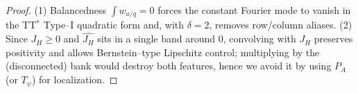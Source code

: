 \begin{proof}
(1) Balancedness $\int w_{a/q}=0$ forces the constant Fourier mode to vanish in the TT$^\ast$ Type–I quadratic form and, with $\delta=2$, removes row/column aliases. (2) Since $J_H\ge0$ and $\widehat{J_H}$ sits in a single band around $0$, convolving with $J_H$ preserves positivity and allows Bernstein–type Lipschitz control; multiplying by the (disconnected) bank would destroy both features, hence we avoid it by using $P_A$ (or $T_\psi$) for localization. 
\end{proof}
